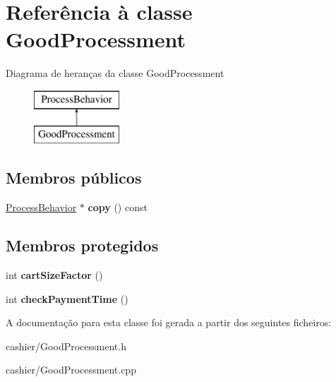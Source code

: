 \hypertarget{classGoodProcessment}{\section{Referência à classe Good\-Processment}
\label{db/dfa/classGoodProcessment}
}
Diagrama de heranças da classe Good\-Processment\begin{figure}[H]
\begin{center}
\leavevmode
\includegraphics[height=2.000000cm]{db/dfa/classGoodProcessment}
\end{center}
\end{figure}
\subsection*{Membros públicos}
\begin{DoxyCompactItemize}
\item 
\hypertarget{classGoodProcessment_a1c2dfca6ae6c4ab034dfcfc423bf338b}{\hyperlink{classProcessBehavior}{Process\-Behavior} $\ast$ {\bfseries copy} () const }\label{db/dfa/classGoodProcessment_a1c2dfca6ae6c4ab034dfcfc423bf338b}

\end{DoxyCompactItemize}
\subsection*{Membros protegidos}
\begin{DoxyCompactItemize}
\item 
\hypertarget{classGoodProcessment_a99170ba3993e1511cc1fa82aba883bbc}{int {\bfseries cart\-Size\-Factor} ()}\label{db/dfa/classGoodProcessment_a99170ba3993e1511cc1fa82aba883bbc}

\item 
\hypertarget{classGoodProcessment_a126bda449e47094c49f501dcb0cb5d88}{int {\bfseries check\-Payment\-Time} ()}\label{db/dfa/classGoodProcessment_a126bda449e47094c49f501dcb0cb5d88}

\end{DoxyCompactItemize}


A documentação para esta classe foi gerada a partir dos seguintes ficheiros\-:\begin{DoxyCompactItemize}
\item 
cashier/Good\-Processment.\-h\item 
cashier/Good\-Processment.\-cpp\end{DoxyCompactItemize}
